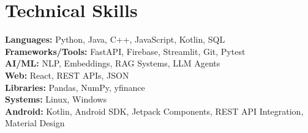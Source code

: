 \documentclass[letterpaper,11pt]{article}
\begin{document}
\section{Technical Skills}
\begin{itemize}[leftmargin=0.15in, label={}, noitemsep]
\small{
\item{
\textbf{Languages:} Python, Java, C++, JavaScript, Kotlin, SQL \\
\textbf{Frameworks/Tools:} FastAPI, Firebase, Streamlit, Git, Pytest \\
\textbf{AI/ML:} NLP, Embeddings, RAG Systems, LLM Agents \\
\textbf{Web:} React, REST APIs, JSON \\
\textbf{Libraries:} Pandas, NumPy, yfinance \\
\textbf{Systems:} Linux, Windows \\
\textbf{Android:} Kotlin, Android SDK, Jetpack Components, REST API Integration, Material Design
}}
\end{itemize}
\end{document}

